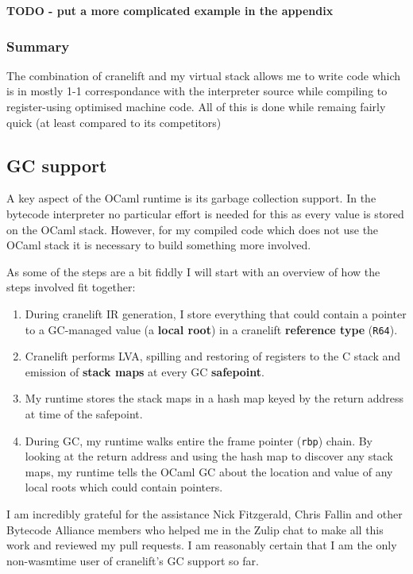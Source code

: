 \textbf{TODO - put a more complicated example in the appendix}

\subsubsection{Summary}

The combination of cranelift and my virtual stack allows me to write code which is in mostly 1-1
correspondance with the interpreter source while compiling to register-using optimised machine
code. All of this is done while remaing fairly quick (at least compared to its competitors)

\subsection{GC support} \label{gc-support}

A key aspect of the OCaml runtime is its garbage collection support. In the bytecode interpreter no
particular effort is needed for this as every value is stored on the OCaml stack. However, for my
compiled code which does not use the OCaml stack it is necessary to build something more involved.

As some of the steps are a bit fiddly I will start with an overview of how the steps involved fit
together:

\begin{enumerate}
      \item During cranelift IR generation, I store everything that could contain a pointer to a
            GC-managed value (a \textbf{local root}) in a cranelift \textbf{reference type}
            (\texttt{R64}).
      \item Cranelift performs LVA, spilling and restoring of registers to the C stack and emission
            of \textbf{stack maps} at every GC \textbf{safepoint}.
      \item My runtime stores the stack maps in a hash map keyed by the return address at time of
            the safepoint.
      \item During GC, my runtime walks entire the frame pointer (\texttt{rbp}) chain. By looking
            at the return address and using the hash map to discover any stack maps, my runtime
            tells the OCaml GC about the location and value of any local roots which could contain
            pointers.
\end{enumerate}

I am incredibly grateful for the assistance Nick Fitzgerald, Chris Fallin and other Bytecode
Alliance members who helped me in the Zulip chat to make all this work and reviewed my pull
requests. I am reasonably certain that I am the only non-wasmtime user of cranelift's GC support so
far.

